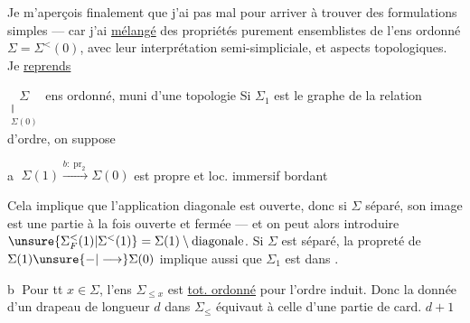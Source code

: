 Je m'aperçois finalement que j'ai
pas mal  pour arriver à trouver des
formulations simples --- car j'ai \uline{mélangé} des
propriétés purement ensemblistes de l'ens ordonné
$\Sigma=\Sigma^{<}(0)$, avec leur interprétation semi-simpliciale,
et  aspects topologiques. Je \uline{reprends}

$\underset{\substack{\Vert\\\Sigma(0)}}{\Sigma}$ ens ordonné, muni d'une topologie 
Si $\Sigma_1$ est le graphe de la relation d'ordre, on suppose

\textcircled{a} $\Sigma(1)\xrightarrow{b:\operatorname{pr}_2}\Sigma(0)$ est propre et loc. immersif bordant
 

 
Cela implique que l'application diagonale est
ouverte, donc si $\Sigma$ séparé, son image est une
partie à la fois ouverte et fermée --- et on
peut alors introduire $\unsure{\Sigma_F^{<}(1)|\Sigma^{<}(1)}=\Sigma(1)\setminus\text{diagonale}$.
Si $\Sigma$ est séparé, la propreté de $\Sigma(1)\unsure{-|\longrightarrow}\Sigma(0)$
implique aussi que $\Sigma_1$ est  dans \inserted{$\Sigma\times\Sigma$}.

\textcircled{b} Pour tt $x\in\Sigma$, l'ens  $\Sigma_{\leq x}$  est \uline{tot. ordonné}
pour l'ordre induit.
 Donc la donnée d'un drapeau  de longueur
$d$ dans $\Sigma_\leq$ équivaut à celle d'une partie de card. $d+1$
